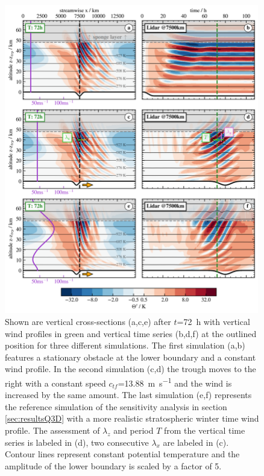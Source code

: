 \begin{figure}[tbp]
    \centering
    \includegraphics[width=0.99\textwidth]{figures_lidar/lidana_th.png}
    \caption{Shown are vertical cross-sections (a,c,e) after $t$=\SI{72}{\hour} with vertical wind profiles in green and vertical time series (b,d,f) at the outlined position for three different simulations. The first simulation (a,b) features a stationary obstacle at the lower boundary and a constant wind profile. In the second simulation (c,d) the trough moves to the right with a constant speed $c_{tf}$=\SI{13.88}{\meter \per \second} and the wind is increased by the same amount. The last simulation (e,f) represents the reference simulation of the sensitivity analysis in section \ref{sec:resultsQ3D} with a more realistic stratospheric winter time wind profile. The assessment of $\lambda_z$ and period $T$ from the vertical time series is labeled in (d), two consecutive $\lambda_x$ are labeled in (c). Contour lines represent constant potential temperature and the amplitude of the lower boundary is scaled by a factor of 5.}
    \label{fig:lidar_sim}
\end{figure}

